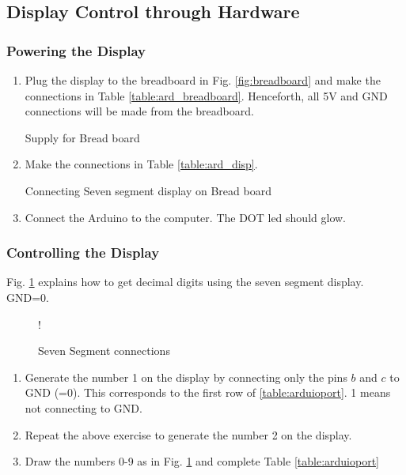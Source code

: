 \subsection{Display Control through Hardware }
\subsubsection{Powering the Display}
\begin{enumerate}[label=\arabic*.,ref=\theenumi]

\item
	Plug the display to the breadboard in Fig. \ref{fig:breadboard} and make the connections in Table \ref{table:ard_breadboard}.  Henceforth, all 5V and GND connections will be made from the breadboard.

\begin{table}[H]
\centering

\caption{Supply for Bread board}
\label{table:ard_breadboard}
\end{table}


\item
Make the  connections in Table \ref{table:ard_disp}.  
%
\begin{table}[H]
\centering

\caption{Connecting Seven segment display on Bread board}
\label{table:ard_disp}
\end{table}
%
\item
	Connect the Arduino to the computer. The DOT led should glow.
\end{enumerate}
\subsubsection{Controlling the Display}
%
Fig. \ref{fig:sevenseg12} explains how to get decimal digits using the seven segment display. GND=0.  
\begin{figure}[H]
\begin{center}
 {!} {

}
\end{center}
\caption{Seven Segment connections}
\label{fig:sevenseg12}
\end{figure}
\begin{enumerate}[label=\arabic*.,ref=\theenumi]
\item	Generate the number 1 on the display by connecting only the pins $b$ and $c$ to GND (=0). This corresponds to the  first row of \ref{table:arduioport}. 1 means not connecting to GND.
\item
	Repeat the above exercise to generate the number 2 on the display.
%
\item
Draw the numbers 0-9 as in Fig. \ref{fig:sevenseg12} and complete Table \ref{table:arduioport}
%	
\begin{table}[H]
\centering

\caption{}
\label{table:arduioport}
\end{table}
%
%
\end{enumerate}
